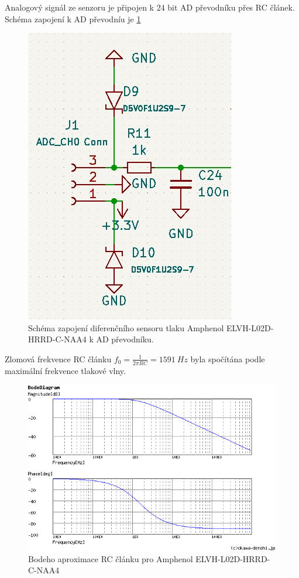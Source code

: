 Analogový signál ze senzoru je připojen k 24 bit AD převodníku přes RC článek. Schéma zapojení k AD převodníu je \ref{fig:amphenol_circuit}


\begin{figure}[H]
    \centering
    \includegraphics{pictures/diff_sen_circuit.jpg}
    \caption{Schéma zapojení diferenčního sensoru tlaku Amphenol ELVH-L02D-HRRD-C-NAA4 k AD převodníku.}
    \label{fig:amphenol_circuit}
\end{figure}

Zlomová frekvence RC článku $f_0 = \frac{1}{2 \pi RC} = 1591 \ Hz $ byla spočítána podle maximální frekvence tlakové vlny. 
\begin{figure}[H]
    \centering
    \includegraphics{pictures/rc_1k_100n_1591.png}
    \caption{Bodeho aproximace RC článku pro Amphenol ELVH-L02D-HRRD-C-NAA4}
    \label{fig:amphenol_filter}
\end{figure}

